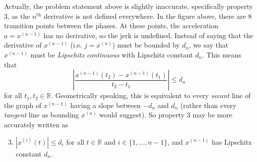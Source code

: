 \documentclass{article}
\newcommand{\R}{\mathbb{R}}
\newcommand{\abs}[1]{\left\vert #1 \right\vert}
\begin{document}
Actually, the problem statement above is slightly inaccurate,
specifically property 3,
as the $n^\text{th}$ derivative is not defined everywhere.
In the figure above, there are $8$ transition points between the phases.
At these points, the acceleration $a = x^{(n-1)}$ has no derivative,
so the jerk is undefined.
Instead of saying that the derivative of $x^{(n-1)}$
(i.e. $j = x^{(n)}$) must be bounded by $d_n$,
we say that $x^{(n-1)}$ must be \textit{Lipschitz continuous}
with Lipschitz constant $d_n$.
This means that
\[
\abs{\frac{x^{(n-1)}(t_2)-x^{(n-1)}(t_1)}{t_2-t_1}} \leq d_n
\]
for all $t_1, t_2 \in \R$.
Geometrically speaking, this is equivalent to
every \textit{secant} line of the graph of $x^{(n-1)}$
having a slope between $-d_n$ and $d_n$
(rather than every \textit{tangent} line as bounding $x^{(n)}$ would suggest).
So property 3 may be more accurately written as
\begin{enumerate}
  \setcounter{enumi}{2}
\item
  $\abs{x^{(i)}(t)} \leq d_i$
  for all $t \in \R$ and $i \in \{1, \ldots, n-1\}$,
  and $x^{(n-1)}$ has Lipschitz constant $d_n$.
\end{enumerate}
\end{document}
